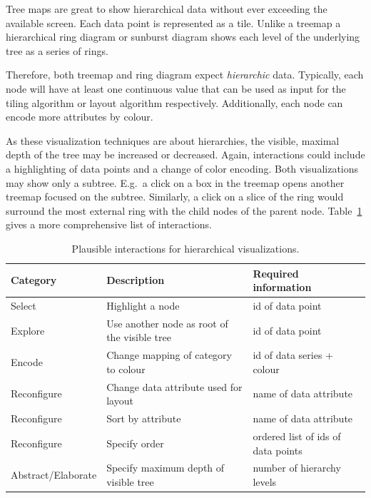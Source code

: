 Tree maps are great to show hierarchical data without ever exceeding the available screen.
Each data point is represented as a tile.
Unlike a treemap a hierarchical ring diagram or sunburst diagram shows each level of the underlying tree as a series of rings.

Therefore, both treemap and ring diagram expect \emph{hierarchic} data.
Typically, each node will have at least one continuous value that can be used as input for the tiling algorithm or layout algorithm respectively.
Additionally, each node can encode more attributes by colour.

As these visualization techniques are about hierarchies, the visible, maximal depth of the tree may be increased or decreased.
Again, interactions could include a highlighting of data points and a change of color encoding.
Both visualizations may show only a subtree.
E.g.\ a click on a box in the treemap opens another treemap focused on the subtree.
Similarly, a click on a slice of the ring would surround the most external ring with the child nodes of the parent node.
Table~\ref{tab:analysis:hierarchies:interactions} gives a more comprehensive list of interactions.


\begin{table}[H]
  \caption{Plausible interactions for hierarchical visualizations.}%
  \label{tab:analysis:hierarchies:interactions}
  \begin{tabular*}{\textwidth}{lll}
    \bf Category & \bf Description & \bf Required information \\
    \hline
    Select & Highlight a node & id of data point \\
    Explore & Use another node as root of the visible tree & id of data point \\
    Encode & Change mapping of category to colour & id of data series + colour \\
    Reconfigure & Change data attribute used for layout & name of data attribute \\
    Reconfigure & Sort by attribute & name of data attribute \\
    Reconfigure & Specify order & ordered list of ids of data points \\
    Abstract/Elaborate & Specify maximum depth of visible tree & number of hierarchy levels \\
  \end{tabular*}
\end{table}

